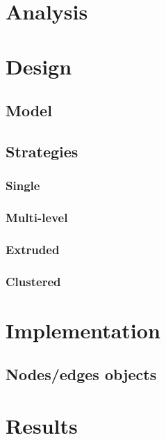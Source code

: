 
\section{Analysis}

\section{Design}
\subsection{Model}
\subsection{Strategies}
\subsubsection{Single}
\subsubsection{Multi-level}
\subsubsection{Extruded}
\subsubsection{Clustered}

\section{Implementation}
\subsection{Nodes/edges objects}

\section{Results}



